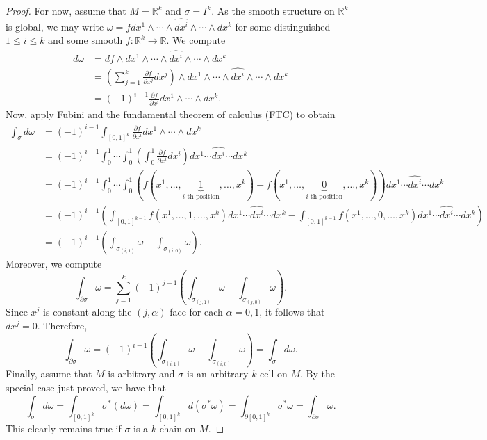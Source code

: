 \documentclass[10pt,letterpaper,cm]{nupset}
\theoremstyle{definition}
\theoremstyle{theorem}
\theoremstyle{remark}
\newcommand{\R}{\mathbb R}
\newcommand{\1}{\mathbf{1}}
\newcommand{\0}{\vec 0}
\begin{document}
\begin{proof}
For now, assume that $M= \R^k$ and $\sigma = I^k$. As the smooth structure on $\R^k$ is global, we may write $\omega = fdx^1 \wedge \cdots \wedge \widehat{dx^i} \wedge \cdots \wedge dx^k$ for some distinguished $1\leq i \leq k$ and some smooth $f: \R^k \to \R$. We compute 
\begin{align*}
 d\omega & = df \wedge dx^1 \wedge \cdots \wedge \widehat{dx^i} \wedge \cdots \wedge dx^k
\\ & = \left(\sum_{j=1}^k\frac{\partial{f}}{\partial{x^j}}dx^j \right)\wedge dx^1 \wedge \cdots \wedge \widehat{dx^i} \wedge \cdots \wedge dx^k
\\ & = ({-}1)^{i-1} \frac{\partial{f}}{\partial{x^i}}dx^1 \wedge \cdots \wedge dx^k.
\end{align*}
Now, apply Fubini and the fundamental theorem of calculus (FTC) to obtain
\begin{align*}
 \int_{\sigma}d\omega & = ({-}1)^{i-1}\int_{[0,1]^k} \frac{\partial{f}}{\partial{x^i}}dx^1 \wedge \cdots \wedge dx^k
\\ & = ({-}1)^{i-1}\int_0^1 \cdots \int_0^1 \left(\int_0^1  \frac{\partial{f}}{\partial{x^i}}dx^i \right)dx^1 \cdots \widehat{dx^i}  \cdots dx^k
\\ & = ({-}1)^{i-1}\int_0^1 \cdots \int_0^1(f(x^1, \ldots, \underbrace{1}_{i\text{-th position}}, \ldots, x^k) - f(x^1, \ldots, \underbrace{0}_{i\text{-th position}}, \ldots, x^k))dx^1 \cdots \widehat{dx^i}  \cdots dx^k
\\ & =  ({-}1)^{i-1}\left( \int_{[0,1]^{k-1}} f(x^1, \ldots, 1, \ldots, x^k)dx^1 \cdots \widehat{dx^i}  \cdots dx^k -\int_{[0,1]^{k-1}}f(x^1, \ldots, 0, \ldots, x^k)dx^1 \cdots \widehat{dx^i}  \cdots dx^k \right)
\\ & = ({-}1)^{i-1}\left(\int_{\sigma_{(i, 1)}}\omega - \int_{\sigma_{(i, 0)}}\omega \right) .
\end{align*}
Moreover, we compute
$$ \int_{\partial{\sigma}}\omega = \sum_{j=1}^k({-}1)^{j-1}\left(\int_{\sigma_{(j, 1)}}\omega - \int_{\sigma_{(j, 0)}}\omega \right).$$
Since $x^j$ is constant along the $(j, \alpha)$-face for each $\alpha = 0, 1$, it follows that $dx^j = 0$. Therefore, $$ \int_{\partial{\sigma}}\omega =   ({-}1)^{i-1}\left(\int_{\sigma_{(i, 1)}}\omega - \int_{\sigma_{(i, 0)}}\omega \right) = \int_{\sigma} d\omega.$$
Finally, assume that $M$ is arbitrary and $\sigma $ is an arbitrary $k$-cell on $M$. By the special case just proved, we have that
$$  \int_{\sigma}d\omega = \int_{[0,1]^k}\sigma^{\ast}(d\omega) = \int_{[0,1]^k}d(\sigma^{\ast}\omega) = \int_{\partial{[0,1]^k}}\sigma^{\ast} \omega = \int_{\partial{\sigma}} \omega .$$
This clearly remains true if $\sigma$ is a $k$-chain on $M$.
\end{proof}
\end{document}

